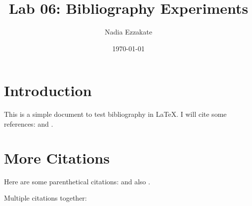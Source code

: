 \documentclass{article}
\begin{document}
\title{Lab 06: Bibliography Experiments}
\author{Nadia Ezzakate}
\date{\today}
\maketitle

\section{Introduction}
This is a simple document to test bibliography in LaTeX. 
I will cite some references: \citet{knuth1984} and \citet{lamport1994}.

\section{More Citations}
Here are some parenthetical citations: \citep{goossens1993} 
and also \citep[p.~42]{knuth1984}.

Multiple citations together: \citep{knuth1984,lamport1994,goossens1993}



\end{document}
